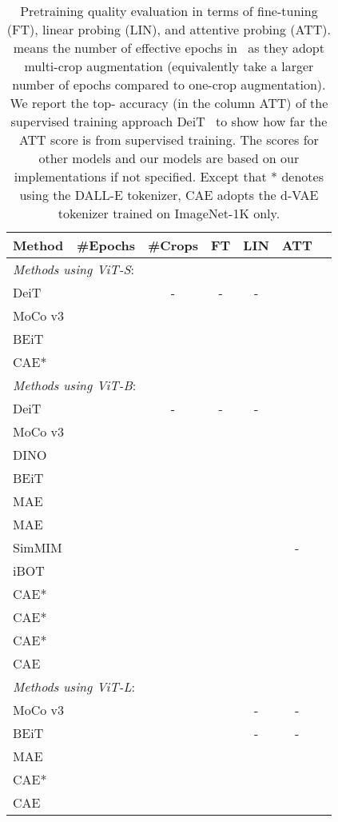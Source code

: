 \documentclass[twocolumn]{svjour3}          \smartqed  \usepackage{graphicx}
\def \ours {CAE*\xspace}
\def \oursdvae {CAE\xspace}
\begin{document}
\begin{table}[t]
  \centering  
  \caption{Pretraining quality evaluation
  in terms of 
  fine-tuning (FT),
  linear probing (LIN),
  and attentive probing (ATT). 
   means the number of effective epochs in~\cite{zhou2021ibot} as they adopt multi-crop augmentation (equivalently take a larger number of epochs compared to one-crop augmentation).
  We report the top- accuracy
  (in the column ATT)
  of the supervised training approach 
  DeiT~\cite{touvron2020deit}
  to show how far the ATT score is from supervised training.
 The scores
  for other models 
  and our models 
  are based on our implementations
  if not specified.
    {
    Except that * denotes using the DALL-E tokenizer, CAE adopts
    the d-VAE tokenizer trained on ImageNet-1K only.
    }
  } 
  \setlength{\tabcolsep}{6pt}
\renewcommand{\arraystretch}{1.1}
    \begin{tabular}{l c c c  c c c}
      \toprule
      Method  & \#Epochs & \#Crops & FT  & LIN & ATT \\
      \midrule
      \multicolumn{5}{l}{\emph{Methods using ViT-S}:}\\
      DeiT &  &-&-&-&   \\
      MoCo v3  &  &  &  &  &  \\
      BEiT   &    &  &  &  & \\
    \ours &  &  &  &  & \\
      \midrule
      \multicolumn{5}{l}{\emph{Methods using ViT-B}:}\\
      DeiT &  &-&-&-&    \\
      MoCo v3   &  &  &  &  & \\
      DINO  &   &  &  &  &  \\
      BEiT   &   &  &  &  & \\
      MAE &    &  &  &  &  \\
      MAE &    &  &  &  &  \\
      SimMIM &  &  &  &  & - \\
      iBOT &   &  &   &   &  \\
      \ours &  &  &  &  &  \\
     \ours &  &  &  &  &  \\
     \ours &  &  &  &  &  \\
     \oursdvae &  &  &  &  &  \\
      \midrule
      \multicolumn{5}{l}{\emph{Methods using ViT-L}:}\\
      MoCo v3 &  &  &  & - & - \\
      BEiT &  &  &  & - & - \\
      MAE &    &  &  &  &  \\
      \ours &    &  &  &  &  \\
      \oursdvae &    &  &  &  &  \\
      \bottomrule
  \end{tabular}
  \label{tab:pretrainingvaluation}
\end{table}
\end{document}
